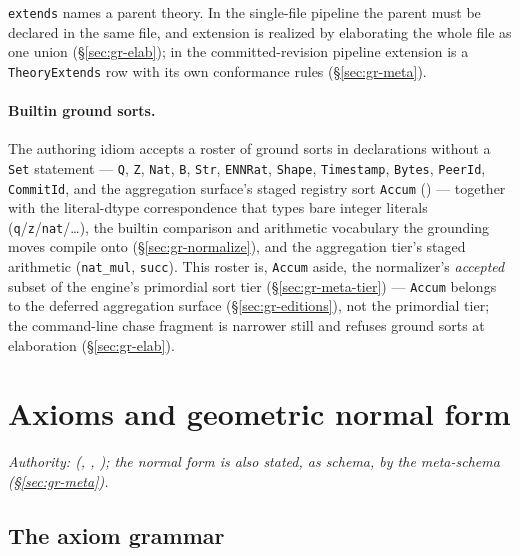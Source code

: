 \texttt{extends} names a parent theory. In the single-file pipeline
the parent must be declared in the same file, and extension is
realized by elaborating the whole file as one union
(\S\ref{sec:gr-elab}); in the committed-revision pipeline extension
is a \texttt{TheoryExtends} row with its own conformance rules
(\S\ref{sec:gr-meta}).

\paragraph{Builtin ground sorts.} The authoring idiom accepts a
roster of ground sorts in declarations without a \texttt{Set}
statement — \texttt{Q}, \texttt{Z}, \texttt{Nat}, \texttt{B},
\texttt{Str}, \texttt{ENNRat}, \texttt{Shape}, \texttt{Timestamp},
\texttt{Bytes}, \texttt{PeerId}, \texttt{CommitId}, and the
aggregation surface's staged registry sort \texttt{Accum}
() — together with the
literal-dtype correspondence that types bare integer literals
(\texttt{q}/\texttt{z}/\texttt{nat}/…), the builtin comparison
and arithmetic vocabulary the grounding moves compile onto
(\S\ref{sec:gr-normalize}), and the aggregation tier's staged
arithmetic (\texttt{nat\_mul}, \texttt{succ}). This roster is,
\texttt{Accum} aside, the normalizer's \emph{accepted} subset of the
engine's primordial sort tier (\S\ref{sec:gr-meta-tier}) —
\texttt{Accum} belongs to the deferred aggregation surface
(\S\ref{sec:gr-editions}), not the primordial tier; the command-line
chase fragment is narrower still and refuses ground sorts at
elaboration (\S\ref{sec:gr-elab}).

\section{Axioms and geometric normal form}
\label{sec:gr-axioms}

\emph{Authority:  (,
, ); the normal form is also stated,
as schema, by the meta-schema (\S\ref{sec:gr-meta}).}

\subsection{The axiom grammar}
\label{sec:gr-axiom-grammar}

